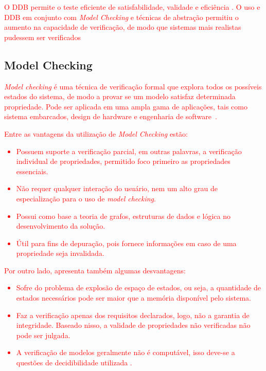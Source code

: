 \par
\textcolor{red}{O DDB permite o teste eficiente de satisfabilidade, validade e eficiência \cite{kropf2013introduction}. O uso e DDB em conjunto com \textit{Model Checking} e técnicas de abstração permitiu o aumento na capacidade de verificação, de modo que sistemas mais realistas pudessem ser verificados\cite{biere2003bounded}}

\subsection{Model Checking}
\par
\textcolor{red}{\textit{Model checking} é uma técnica de verificação formal que explora todos os possíveis estados do sistema, de modo a provar se um modelo satisfaz determinada propriedade. Pode ser aplicada em uma ampla gama de aplicações, tais como sistema embarcados, design de hardware e engenharia de software~\cite{baier2008principles}.}

\par
\textcolor{red}{Entre as vantagens da utilização de \textit{Model Checking} estão:
\begin{itemize}
    \item Possuem suporte a verificação parcial, em outras palavras, a verificação individual de propriedades, permitido foco primeiro as propriedades essenciais\cite{baier2008principles}.
    \item Não requer qualquer interação do usuário, nem um alto grau de especialização para o uso de \textit{model checking}\cite{baier2008principles}.
    \item Possui como base a teoria de grafos, estruturas de dados e lógica no desenvolvimento da solução\cite{baier2008principles}.
    \item Útil para fins de depuração, pois fornece informações em caso de uma propriedade seja invalidada\cite{baier2008principles}.
\end{itemize}}

\par
\textcolor{red}{Por outro lado, apresenta também algumas desvantagens:
\begin{itemize}
    \item Sofre do problema de explosão de espaço de estados, ou seja, a quantidade de estados necessários pode ser maior que a memória disponível pelo sistema\cite{baier2008principles}.
    \item Faz a verificação apenas dos requisitos declarados, logo, não a garantia de integridade. Baseado nisso, a validade de propriedades não verificadas não pode ser julgada\cite{baier2008principles}.
    \item A verificação de modelos geralmente não é computável,  isso deve-se a questões de decidibilidade utilizada \cite{baier2008principles}.
\end{itemize}}

